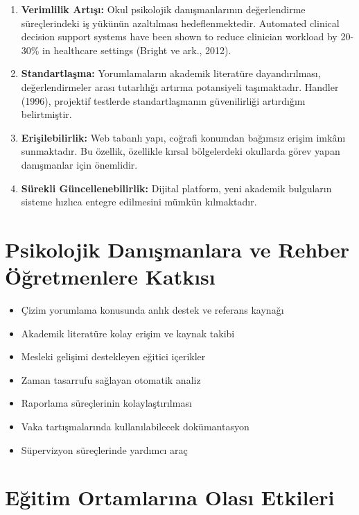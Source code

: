 \begin{enumerate}
  \item \textbf{Verimlilik Artışı:} Okul psikolojik danışmanlarının değerlendirme süreçlerindeki iş yükünün azaltılması hedeflenmektedir. Automated clinical decision support systems have been shown to reduce clinician workload by 20-30\% in healthcare settings (Bright ve ark., 2012).

  \item \textbf{Standartlaşma:} Yorumlamaların akademik literatüre dayandırılması, değerlendirmeler arası tutarlılığı artırma potansiyeli taşımaktadır. Handler (1996), projektif testlerde standartlaşmanın güvenilirliği artırdığını belirtmiştir.

  \item \textbf{Erişilebilirlik:} Web tabanlı yapı, coğrafi konumdan bağımsız erişim imkânı sunmaktadır. Bu özellik, özellikle kırsal bölgelerdeki okullarda görev yapan danışmanlar için önemlidir.

  \item \textbf{Sürekli Güncellenebilirlik:} Dijital platform, yeni akademik bulguların sisteme hızlıca entegre edilmesini mümkün kılmaktadır.
\end{enumerate}

\section{Psikolojik Danışmanlara ve Rehber Öğretmenlere Katkısı}

\begin{itemize}
  \item Çizim yorumlama konusunda anlık destek ve referans kaynağı
  \item Akademik literatüre kolay erişim ve kaynak takibi
  \item Mesleki gelişimi destekleyen eğitici içerikler
  \item Zaman tasarrufu sağlayan otomatik analiz
  \item Raporlama süreçlerinin kolaylaştırılması
  \item Vaka tartışmalarında kullanılabilecek dokümantasyon
  \item Süpervizyon süreçlerinde yardımcı araç
\end{itemize}

\section{Eğitim Ortamlarına Olası Etkileri}

